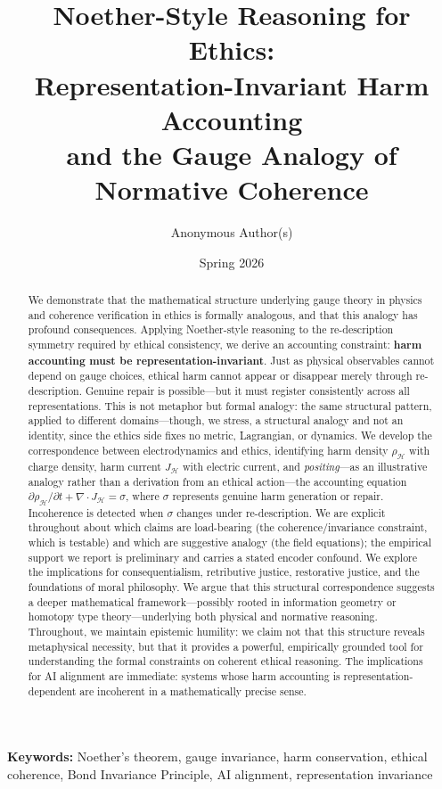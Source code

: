 \documentclass[12pt,letterpaper]{article}
\title{\textbf{Noether-Style Reasoning for Ethics:\\Representation-Invariant Harm Accounting\\and the Gauge Analogy of Normative Coherence}}
\author{Anonymous Author(s)}
\date{Spring 2026}
\theoremstyle{definition}
\theoremstyle{remark}
\newcommand{\harm}{\mathcal{H}}
\begin{document}
\maketitle

\noindent\textbf{Keywords:} Noether's theorem, gauge invariance, harm conservation, ethical coherence, Bond Invariance Principle, AI alignment, representation invariance

\begin{abstract}
We demonstrate that the mathematical structure underlying gauge theory in physics and coherence verification in ethics is formally analogous, and that this analogy has profound consequences. Applying Noether-style reasoning to the re-description symmetry required by ethical consistency, we derive an accounting constraint: \textbf{harm accounting must be representation-invariant}. Just as physical observables cannot depend on gauge choices, ethical harm cannot appear or disappear merely through re-description. Genuine repair is possible---but it must register consistently across all representations. This is not metaphor but formal analogy: the same structural pattern, applied to different domains---though, we stress, a structural analogy and not an identity, since the ethics side fixes no metric, Lagrangian, or dynamics. We develop the correspondence between electrodynamics and ethics, identifying harm density $\rho_\harm$ with charge density, harm current $J_\harm$ with electric current, and \emph{positing}---as an illustrative analogy rather than a derivation from an ethical action---the accounting equation $\partial \rho_\harm / \partial t + \nabla \cdot J_\harm = \sigma$, where $\sigma$ represents genuine harm generation or repair. Incoherence is detected when $\sigma$ changes under re-description. We are explicit throughout about which claims are load-bearing (the coherence/invariance constraint, which is testable) and which are suggestive analogy (the field equations); the empirical support we report is preliminary and carries a stated encoder confound. We explore the implications for consequentialism, retributive justice, restorative justice, and the foundations of moral philosophy. We argue that this structural correspondence suggests a deeper mathematical framework---possibly rooted in information geometry or homotopy type theory---underlying both physical and normative reasoning. Throughout, we maintain epistemic humility: we claim not that this structure reveals metaphysical necessity, but that it provides a powerful, empirically grounded tool for understanding the formal constraints on coherent ethical reasoning. The implications for AI alignment are immediate: systems whose harm accounting is representation-dependent are incoherent in a mathematically precise sense.
\end{abstract}
\end{document}
